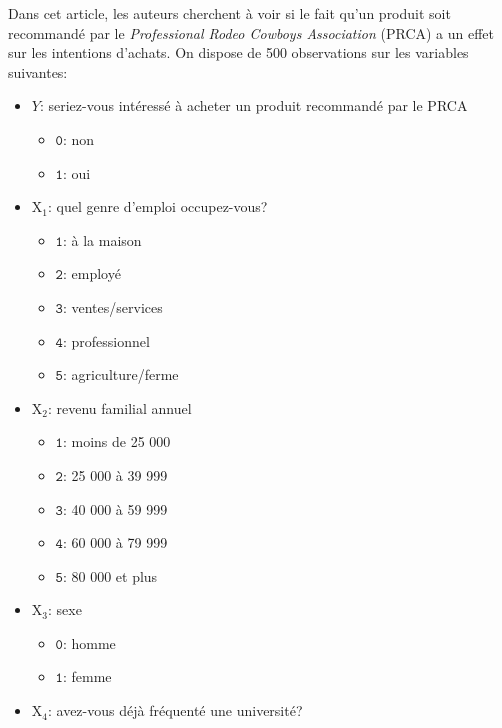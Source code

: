 \documentclass[
  11pt,
  letterpaper,
]{book}
\providecommand{\tightlist}{%
  \setlength{\itemsep}{0pt}\setlength{\parskip}{0pt}}\usepackage{longtable,booktabs,array}
\theoremstyle{definition}
\theoremstyle{remark}
\begin{document}
Dans cet article, les auteurs cherchent à voir si le fait qu'un produit
soit recommandé par le \emph{Professional Rodeo Cowboys Association}
(PRCA) a un effet sur les intentions d'achats. On dispose de 500
observations sur les variables suivantes:

\begin{itemize}
\tightlist
\item
  \(Y\): seriez-vous intéressé à acheter un produit recommandé par le
  PRCA

  \begin{itemize}
  \tightlist
  \item
    \(\texttt{0}\): non
  \item
    \(\texttt{1}\): oui
  \end{itemize}
\item
  \(\mathrm{X}_1\): quel genre d'emploi occupez-vous?

  \begin{itemize}
  \tightlist
  \item
    \(\texttt{1}\): à la maison
  \item
    \(\texttt{2}\): employé
  \item
    \(\texttt{3}\): ventes/services
  \item
    \(\texttt{4}\): professionnel
  \item
    \(\texttt{5}\): agriculture/ferme
  \end{itemize}
\item
  \(\mathrm{X}_2\): revenu familial annuel

  \begin{itemize}
  \tightlist
  \item
    \(\texttt{1}\): moins de 25 000
  \item
    \(\texttt{2}\): 25 000 à 39 999
  \item
    \(\texttt{3}\): 40 000 à 59 999
  \item
    \(\texttt{4}\): 60 000 à 79 999
  \item
    \(\texttt{5}\): 80 000 et plus
  \end{itemize}
\item
  \(\mathrm{X}_3\): sexe

  \begin{itemize}
  \tightlist
  \item
    \(\texttt{0}\): homme
  \item
    \(\texttt{1}\): femme
  \end{itemize}
\item
  \(\mathrm{X}_4\): avez-vous déjà fréquenté une université?


\end{itemize}
\end{document}
